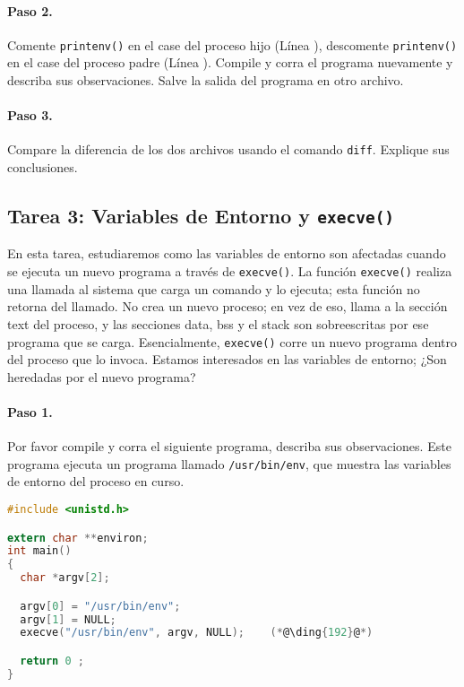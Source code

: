 \paragraph{Paso 2.} Comente {\tt printenv()} en el case del proceso hijo (Línea ), descomente {\tt printenv()} en el case del proceso padre (Línea ). Compile y corra el programa nuevamente y describa sus observaciones. Salve la salida del programa en otro archivo.


\paragraph{Paso 3.} Compare la diferencia de los dos archivos usando el comando 
 {\tt diff}. Explique sus conclusiones.



\subsection{Tarea 3: Variables de Entorno y {\tt execve()}}

En esta tarea, estudiaremos como las variables de entorno son afectadas cuando se ejecuta un nuevo programa a través de {\tt execve()}. La función {\tt execve()} realiza una llamada al sistema que carga un comando y lo ejecuta; esta función no retorna del llamado. No crea un nuevo proceso; en vez de eso, llama a la sección text del proceso, y las secciones data, bss y el stack son sobreescritas por ese programa que se carga. Esencialmente, {\tt execve()} corre un nuevo programa dentro del proceso que lo invoca. Estamos interesados en las variables de entorno; ¿Son heredadas por el nuevo programa?


\paragraph{Paso 1.} Por favor compile y corra el siguiente programa, describa sus observaciones. Este programa ejecuta un programa llamado \texttt{/usr/bin/env}, que muestra las variables de entorno del proceso en curso.

\begin{lstlisting}[language=C, caption=\texttt{myenv.c}]
#include <unistd.h>

extern char **environ;
int main()
{
  char *argv[2];

  argv[0] = "/usr/bin/env";
  argv[1] = NULL;
  execve("/usr/bin/env", argv, NULL);    (*@\ding{192}@*)

  return 0 ;
}
\end{lstlisting}


